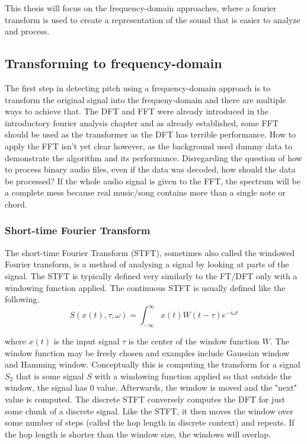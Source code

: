 This thesis will focus on the frequency-domain approaches, where a fourier transform is used to create a representation of the sound that is easier to analyze and process.

\subsection{Transforming to frequency-domain}
The first step in detecting pitch using a frequency-domain approach is to transform the original signal into the frequeny-domain and there are multiple ways to achieve that. The DFT and FFT were already introduced in the introductory fourier analysis chapter and as already established, some FFT should be used as the transformer as the DFT has terrible performance. How to apply the FFT isn't yet clear however, as the background used dummy data to demonstrate the algorithm and its performance. Disregarding the question of how to process binary audio files, even if the data was decoded, how should the data be processed? If the whole audio signal is given to the FFT, the spectrum will be a complete mess because real music/song contains more than a single note or chord.

\subsubsection{Short-time Fourier Transform}
The short-time Fourier Transform (STFT), sometimes also called the windowed Fourier transform, is a method of analysing a signal by looking at parts of the signal. The STFT is typically defined very similarly to the FT/DFT only with a windowing function applied. The continuous STFT is usually defined like the following.
$$S(x(t), \tau, \omega ) = \int_{-\infty}^{\infty} x(t)W(t-\tau)e^{-i\omega t}$$

where $x(t)$ is the input signal $\tau$ is the center of the window function $W$. The window function may be freely chosen and examples include Gaussian window and Hamming window. Conceptually this is computing the transform for a signal $S_2$ that is some signal $S$ with a windowing function applied so that outside the window, the signal has 0 value. Afterwards, the window is moved and the "next" value is computed. The discrete STFT conversely computes the DFT for just some chunk of a discrete signal. Like the STFT, it then moves the window over some number of steps (called the hop length in discrete context) and repeats. If the hop length is shorter than the window size, the windows will overlap.

